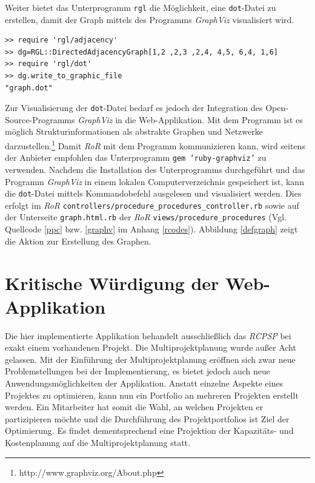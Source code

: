 \documentclass[a4paper,12pt,parskip,bibtotoc,liststotoc]{article}
\begin{document}
Weiter bietet das Unterprogramm \texttt{rgl} die Möglichkeit, eine \texttt{dot}-Datei zu erstellen, damit der Graph mittels des Programms \textit{GraphViz} visualisiert wird.
\newpage


\begin{lstlisting}[caption=Prüfung auf Zyklen mittels des Unterprogramms \glqq rgl\grqq, style=Listing, label=rgl-vonseite]
>> require 'rgl/adjacency'
>> dg=RGL::DirectedAdjacencyGraph[1,2 ,2,3 ,2,4, 4,5, 6,4, 1,6]
>> require 'rgl/dot'
>> dg.write_to_graphic_file
"graph.dot"
\end{lstlisting}

Zur Visualisierung der \texttt{dot}-Datei bedarf es jedoch der Integration des Open-Source-Pro\-gramms \textit{GraphViz} in die Web-Applikation. Mit dem Programm ist es möglich Strukturinformationen als abstrakte Graphen und Netzwerke darzustellen.\footnote{http://www.graphviz.org/About.php} Damit \textit{RoR} mit dem Programm kommunizieren kann, wird seitens der Anbieter empfohlen das Unterprogramm \texttt{gem 'ruby-graphviz'} zu verwenden. Nachdem die Installation des Unterprogramms durchgeführt und das Programm \textit{GraphViz} in einem lokalen Computerverzeichnis gespeichert ist, kann die \texttt{dot}-Datei mittels Kommandobefehl ausgelesen und visualisiert werden. Dies erfolgt im \textit{RoR} \texttt{controllers/procedure\_procedures\_controller.rb} sowie auf der Unterseite \texttt{graph.html.rb} der \textit{RoR} \texttt{views/procedure\_procedures} (Vgl. Quellcode \ref{ppc} bzw. \ref{graphv} im Anhang \ref{rcodes}). Abbildung \ref{defgraph} zeigt die Aktion zur Erstellung des Graphen.




\section{Kritische Würdigung der Web-Applikation} \label{krit}
Die hier implementierte Applikation behandelt ausschließlich das \textit{RCPSP} bei exakt einem vorhandenen Projekt. Die Multiprojektplanung wurde außer Acht gelassen. Mit der Einführung der Multiprojektplanung eröffnen sich zwar neue Problemstellungen bei der Implementierung, es bietet jedoch auch neue Anwendungsmöglichkeiten der Applikation. Anstatt einzelne Aspekte eines Projektes zu optimieren, kann nun ein Portfolio an mehreren Projekten erstellt werden. Ein Mitarbeiter hat somit die Wahl, an welchen Projekten er partizipieren möchte und die Durchführung des Projektportfolios ist Ziel der Optimierung. Es findet dementsprechend eine Projektion der Kapazitäts- und Kostenplanung auf die Multiprojektplanung statt.\\
\end{document}
